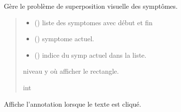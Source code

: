 \documentclass[letterpaper,10pt,english]{sphinxmanual}
\begin{document}
\begin{fulllineitems}
\label{\detokenize{frise:frise.fonctions_frise.chevauchement}}
\pysigstartsignatures
{}
\pysigstopsignatures
\sphinxAtStartPar
Gère le problème de superposition visuelle des symptômes.
\begin{quote}\begin{description}
\begin{itemize}
\item {} 
\sphinxAtStartPar
{} () \textendash{} liste des symptomes avec début et fin

\item {} 
\sphinxAtStartPar
{} () \textendash{} symptome actuel.

\item {} 
\sphinxAtStartPar
{} () \textendash{} indice du symp actuel dans la liste.

\end{itemize}

\sphinxAtStartPar
niveau y où afficher le rectangle.

\sphinxAtStartPar
int

\end{description}\end{quote}

\end{fulllineitems}


\begin{fulllineitems}
\label{\detokenize{frise:frise.fonctions_frise.on_text_click}}
\pysigstartsignatures
{}
\pysigstopsignatures
\sphinxAtStartPar
Affiche l’annotation lorsque le texte est cliqué.

\end{fulllineitems}
\end{document}
